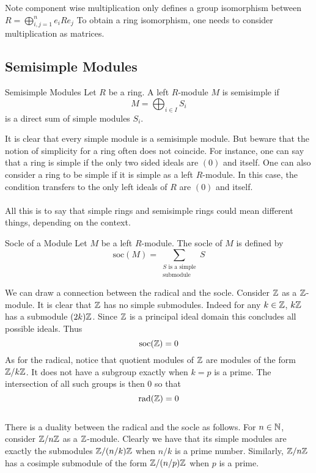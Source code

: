 \documentclass[a4paper]{article}
\begin{document}
Note component wise multiplication only defines a group isomorphism between $R=\bigoplus_{i,j=1}^ne_iRe_j$ To obtain a ring isomorphism, one needs to consider multiplication as matrices. 


\subsection{Semisimple Modules}
\begin{defn}{Semisimple Modules}{} Let $R$ be a ring. A left $R$-module $M$ is semisimple if $$M=\bigoplus_{i\in I}S_i$$ is a direct sum of simple modules $S_i$. 
\end{defn}

It is clear that every simple module is a semisimple module. But beware that the notion of simplicity for a ring often does not coincide. For instance, one can say that a ring is simple if the only two sided ideals are $(0)$ and itself. One can also consider a ring to be simple if it is simple as a left $R$-module. In this case, the condition transfers to the only left ideals of $R$ are $(0)$ and itself. \\~\\

All this is to say that simple rings and semisimple rings could mean different things, depending on the context. 

\begin{defn}{Socle of a Module}{} Let $M$ be a left $R$-module. The socle of $M$ is defined by $$\text{soc}(M)=\sum_{\substack{S\text{ is a simple}\\\text{submodule}}}S$$
\end{defn}

We can draw a connection between the radical and the socle. Consider $\mathbb{Z}$ as a $\mathbb{Z}$-module. It is clear that $\mathbb{Z}$ has no simple submodules. Indeed for any $k\in\mathbb{Z}$, $k\mathbb{Z}$ has a submodule $(2k)\mathbb{Z}$. Since $\mathbb{Z}$ is a principal ideal domain this concludes all possible ideals. Thus $$\text{soc}(\mathbb{Z})=0$$ As for the radical, notice that quotient modules of $\mathbb{Z}$ are modules of the form $\mathbb{Z}/k\mathbb{Z}$. It does not have a subgroup exactly when $k=p$ is a prime. The intersection of all such groups is then $0$ so that $$\text{rad}(\mathbb{Z})=0$$~\\

There is a duality between the radical and the socle as follows. For $n\in\mathbb{N}$, consider $\mathbb{Z}/n\mathbb{Z}$ as a $\mathbb{Z}$-module. Clearly we have that its simple modules are exactly the submodules $\mathbb{Z}/(n/k)\mathbb{Z}$ when $n/k$ is a prime number. Similarly, $\mathbb{Z}/n\mathbb{Z}$ has a cosimple submodule of the form $\mathbb{Z}/(n/p)\mathbb{Z}$ when $p$ is a prime. \\~\\
\end{document}
